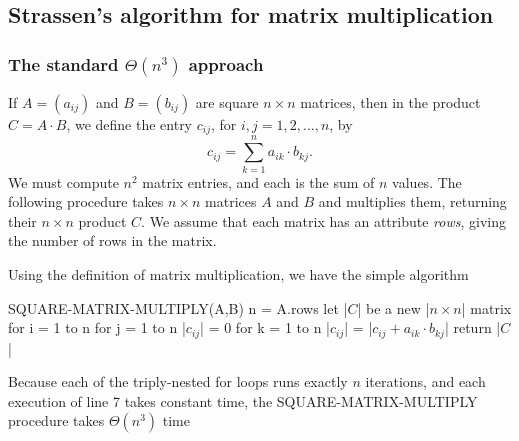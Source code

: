 \documentclass{report}
\begin{document}
        \subsection{Strassen’s algorithm for matrix multiplication}

        \bigbreak \noindent 
        \subsubsection{The standard $\Theta(n^{3})$ approach}
        \bigbreak \noindent 
        If \( A = (a_{ij}) \) and \( B = (b_{ij}) \) are square \( n \times n \) matrices, then in the product \( C = A \cdot B \), we define the entry \( c_{ij} \), for \( i, j = 1, 2, \ldots, n \), by
        \[
            c_{ij} = \sum_{k=1}^n a_{ik} \cdot b_{kj} . \tag{4.8}
        \]
        We must compute \( n^2 \) matrix entries, and each is the sum of \( n \) values. The following procedure takes \( n \times n \) matrices \( A \) and \( B \) and multiplies them, returning their \( n \times n \) product \( C \). We assume that each matrix has an attribute \textit{rows}, giving the number of rows in the matrix.

        \bigbreak \noindent 
        Using the definition of matrix multiplication, we have the simple algorithm
        \bigbreak \noindent 
        \begin{cppcode}
        SQUARE-MATRIX-MULTIPLY(A,B)
            n = A.rows
            let |$C$| be a new |$n\times n$| matrix
            for i = 1 to n
                for j = 1 to n
                    |$c_{ij}$| = 0
                    for k = 1 to n
                        |$c_{ij}$| = |$c_{ij} + a_{ik} \cdot  b_{kj}$|
            return |$C$|
        \end{cppcode}
        \bigbreak \noindent 
        Because each of the triply-nested for loops runs exactly $n$ iterations, and each execution of line 7 takes constant time, the SQUARE-MATRIX-MULTIPLY procedure takes $\Theta(n^{3}) $ time
        \pagebreak 
\end{document}
